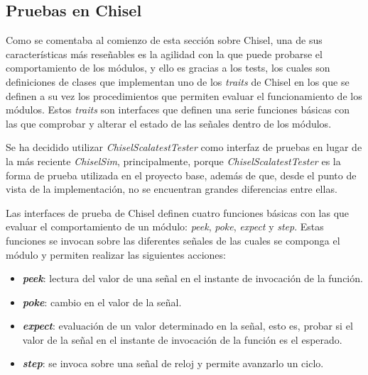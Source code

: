 \subsection{Pruebas en Chisel}

Como se comentaba al comienzo de esta sección sobre Chisel, una de sus características más reseñables es la agilidad con la que puede probarse el comportamiento de los módulos, y ello es gracias a los tests, los cuales son definiciones de clases que implementan uno de los \textit{traits} de Chisel en los que se definen a su vez los procedimientos que permiten evaluar el funcionamiento de los módulos. Estos \textit{traits} son interfaces que definen una serie funciones básicas con las que comprobar y alterar el estado de las señales dentro de los módulos.

Se ha decidido utilizar \textit{ChiselScalatestTester} como interfaz de pruebas en lugar de la más reciente \textit{ChiselSim}, principalmente, porque \textit{ChiselScalatestTester} es la forma de prueba utilizada en el proyecto base, además de que, desde el punto de vista de la implementación, no se encuentran grandes diferencias entre ellas.

Las interfaces de prueba de Chisel definen cuatro funciones básicas con las que evaluar el comportamiento de un módulo: \textit{peek}, \textit{poke},  \textit{expect} y \textit{step}. Estas funciones se invocan sobre las diferentes señales de las cuales se componga el módulo y permiten realizar las siguientes acciones:

\vspace{-0.1cm}
\begin{itemize}
  \item \textbf{\textit{peek}}: lectura del valor de una señal en el instante de invocación de la función.
  \vspace{-0.3cm}
  \item \textbf{\textit{poke}}: cambio en el valor de la señal.
  \vspace{-0.3cm}
  \item \textbf{\textit{expect}}: evaluación de un valor determinado en la señal, esto es, probar si el valor de la señal en el instante de invocación de la función es el esperado.
  \vspace{-0.3cm}
  \item \textbf{\textit{step}}: se invoca sobre una señal de reloj y permite avanzarlo un ciclo.
\end{itemize}
\vspace{-0.1cm}

